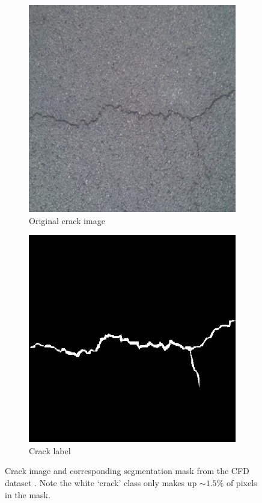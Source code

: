 \documentclass[a4paper,12pt]{report}
\begin{document}
    \begin{figure}
        \centering
        \begin{subfigure}{.5\textwidth}
            \centering
            \includegraphics[width=0.8\linewidth]{res/dataset_CFD_029.png}
            \caption{Original crack image}
            \label{fig:crack-percentages-sub1}
        \end{subfigure}%
        \begin{subfigure}{.5\textwidth}
            \centering
            \includegraphics[width=0.8\linewidth]{res/dataset_CFD_029_label.png}
            \caption{Crack label}
            \label{fig:crack-percentages-sub2}
        \end{subfigure}
        \caption{Crack image and corresponding segmentation mask from the CFD dataset \cite{shi2016automatic}. Note the white `crack' class only makes up $\sim 1.5\%$ of pixels in the mask.}
        \label{fig:crack-percentages}
    \end{figure}
    
\end{document}
